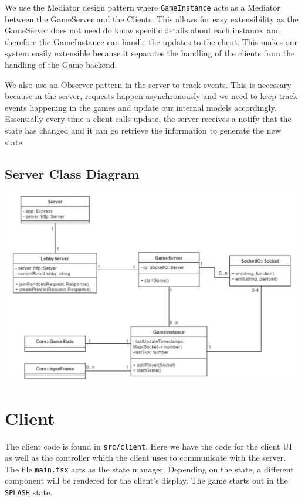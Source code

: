 \documentclass[12pt]{report}
\begin{document}
We use the Mediator design pattern where \texttt{GameInstance} acts as a Mediator between the GameServer and the Clients. This allows for easy extensibility as the GameServer does not need do know specific details about each instance, and therefore the GameInstance can handle the updates to the client. This makes our system easily extensible because it separates the handling of the clients from the handling of the Game backend. 

We also use an Observer pattern in the server to track events. This is necessary because in the server, requests happen asynchronously and we need to keep track events happening in the games and update our internal models accordingly. Essentially every time a client calls update, the server receives a notify that the state has changed and it can go retrieve the information to generate the new state. 

\subsection{Server Class Diagram}
\includegraphics[width=\linewidth]{images/server_classes.png}

\section{Client}

The client code is found in \texttt{src/client}. Here we have the code for the client UI as well as the controller which the client uses to communicate with the server. The file \texttt{main.tsx} acts as the state manager. Depending on the state, a different component will be rendered for the client's display. The game starts out in the \texttt{SPLASH} state.
\end{document}
